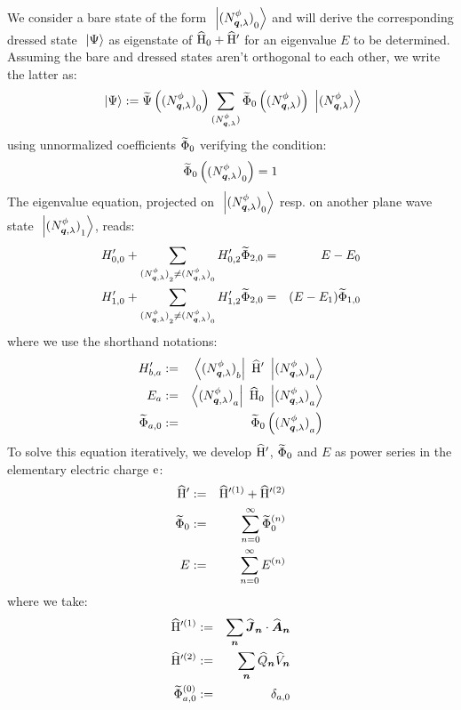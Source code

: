 We consider a bare state of the form $\ket{{\bFQ N \pt \q \sp}_0}$ and will derive the corresponding dressed state $\ket{\Psi}$ as eigenstate of $\Hop_0 + \Hop'$ for an eigenvalue $E$ to be determined. Assuming the bare and dressed states aren't orthogonal to each other, we write the latter as:
\begin{equation*}
\ket{\Psi} \eqdef \FT \Psi \left( {\bFQ N \pt \q \sp}_0 \right) \sum_{\bFQ N \pt \q \sp} \FT \Phi_0 \left( \bFQ N \pt \q \sp \right) \ket{\bFQ N \pt \q \sp}
\end{equation*}
using unnormalized coefficients $\FT \Phi_0$ verifying the condition:
\begin{equation*}
\FT \Phi_0 \left( {\bFQ N \pt \q \sp}_0 \right) = 1
\end{equation*}
The eigenvalue equation, projected on $\ket{{\bFQ N \pt \q \sp}_0}$ resp. on another plane wave state $\ket{{\bFQ N \pt \q \sp}_1}$, reads:
\begin{eqnarray*}
H'_{0,0} + \sum_{{\bFQ N \pt \q \sp}_2 \neq {\bFQ N \pt \q \sp}_0} H'_{0,2} \FT \Phi_{2,0} & = & E - E_0 \\
H'_{1,0} + \sum_{{\bFQ N \pt \q \sp}_2 \neq {\bFQ N \pt \q \sp}_0} H'_{1,2} \FT \Phi_{2,0} & = & ( E - E_1 ) \FT \Phi_{1,0}
\end{eqnarray*}
where we use the shorthand notations:
\begin{eqnarray*}
H'_{b,a} & \eqdef & \bra{{\bFQ N \pt \q \sp}_b} \Hop' \ket{{\bFQ N \pt \q \sp}_a} \\
E_a & \eqdef & \bra{{\bFQ N \pt \q \sp}_a} \Hop_0 \ket{{\bFQ N \pt \q \sp}_a} \\
\FT \Phi_{a,0} & \eqdef & \FT \Phi_0 \left( {\bFQ N \pt \q \sp}_a \right)
\end{eqnarray*}
To solve this equation iteratively, we develop $\Hop'$, $\FT \Phi_0$ and $E$ as power series in the elementary electric charge $\e$:
\begin{eqnarray*}
\Hop' & \eqdef & \Hop'^{(1)} + \Hop'^{(2)} \\
\FT \Phi_0 & \eqdef & \sum_{n=0}^\infty \FT \Phi_0^{(n)} \\
E & \eqdef & \sum_{n=0}^\infty E^{(n)}
\end{eqnarray*}
where we take:
\begin{eqnarray*}
\Hop'^{(1)} & \eqdef & \sum_{\n} \Jop \n \ssp \Aop \n \\
\Hop'^{(2)} & \eqdef & \sum_{\n} \Qop \n \Vop \n \\
\FT \Phi_{a,0}^{(0)} & \eqdef & \delta_{a,0}
\end{eqnarray*}
